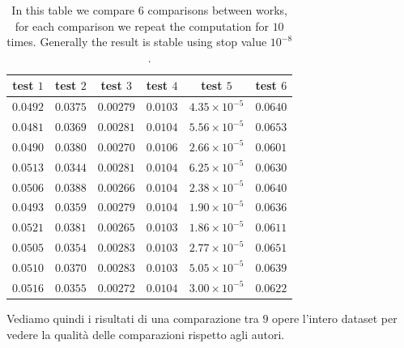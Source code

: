\begin{toDo}
	\begin{table}[h]
		\centering
		\begin{tabular}{|c|c|c|c|c|c|}
			\hline
			\rowcolor{lavender}
			test $1$ & test $2$ & test $3$ & test $4$ & test $5$ & test $6$ \\
			\hline
			\(0.0492\) & \(0.0375\) & \(0.00279\) & \(0.0103\) & \(4.35\times10^{-5}\) & \(0.0640\) \\
			\hline
			\(0.0481\) & \(0.0369\) & \(0.00281\) & \(0.0104\) & \(5.56\times10^{-5}\) & \(0.0653\) \\
			\hline
			\(0.0490\) & \(0.0380\) & \(0.00270\) & \(0.0106\) & \(2.66\times10^{-5}\) & \(0.0601\) \\
			\hline
			\(0.0513\) & \(0.0344\) & \(0.00281\) & \(0.0104\) & \(6.25\times10^{-5}\) & \(0.0630\) \\
			\hline
			\(0.0506\) & \(0.0388\) & \(0.00266\) & \(0.0104\) & \(2.38\times10^{-5}\) & \(0.0640\) \\
			\hline
			\(0.0493\) & \(0.0359\) & \(0.00279\) & \(0.0104\) & \(1.90\times10^{-5}\) & \(0.0636\) \\
			\hline
			\(0.0521\) & \(0.0381\) & \(0.00265\) & \(0.0103\) & \(1.86\times10^{-5}\) & \(0.0611\) \\
			\hline
			\(0.0505\) & \(0.0354\) & \(0.00283\) & \(0.0103\) & \(2.77\times10^{-5}\) & \(0.0651\) \\
			\hline
			\(0.0510\) & \(0.0370\) & \(0.00283\) & \(0.0103\) & \(5.05\times10^{-5}\) & \(0.0639\) \\
			\hline
			\(0.0516\) & \(0.0355\) & \(0.00272\) & \(0.0104\) & \(3.00\times10^{-5}\) & \(0.0622\) \\
			\hline
		\end{tabular}
		\caption[Stability of Test1]{In this table we compare $6$ comparisons between works, for each comparison we repeat the computation for $10$ times. Generally the result is stable using stop value $10^{-8}$.}
		\label{tab:test1stability}
	\end{table}

	\noindent Vediamo quindi i risultati di una comparazione tra $9$ opere l'intero dataset per vedere la qualità delle comparazioni rispetto agli autori.


\end{toDo}
